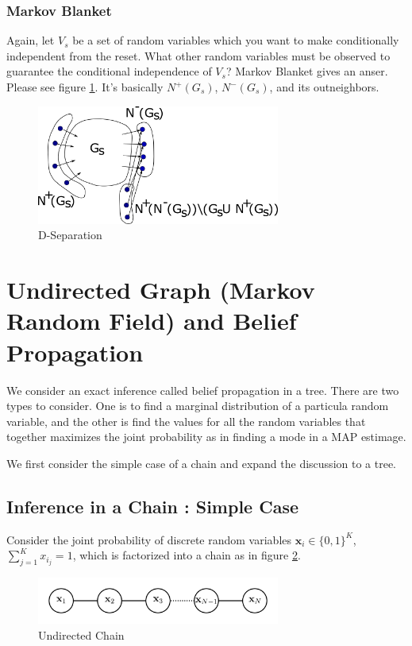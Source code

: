 \documentclass[a4]{article}
\begin{document}
\subsubsection{Markov Blanket}
Again, let $V_s$ be a set of random variables which you want to make conditionally independent from the reset.
What other random variables must be observed to guarantee the conditional independence of $V_s$?
Markov Blanket gives an anser.
Please see figure \ref{fig:markovblanket}.
It's basically $N^+(G_s)$, $N^-(G_s)$, and its outneighbors.
\begin{figure}[!htb]
\centering
\includegraphics[width=8cm]{markovblanket.png}
\caption{D-Separation}
\label{fig:markovblanket}
\end{figure}

\section{Undirected Graph (Markov Random Field) and Belief Propagation}
We consider an exact inference called belief propagation in a tree.
There are two types to consider. One is to find a marginal distribution of a particula random variable, 
and the other is find the values for all the random variables that together maximizes the joint probability as in finding a mode in a MAP estimage.

We first consider the simple case of a chain and expand the discussion to a tree.

\subsection{Inference in a Chain : Simple Case}
Consider the joint probability of discrete random variables $\bm{x}_i \in \{0,1\}^K$, $\sum_{j=1}^K x_{i_j} = 1$,
  which is factorized into a chain as in figure \ref{fig:chain_undirected}.
\begin{figure}[!htb]
\centering
\includegraphics[width=8cm]{chain_undirected.png}
\caption{Undirected Chain}
\label{fig:chain_undirected}
\end{figure}
\end{document}
